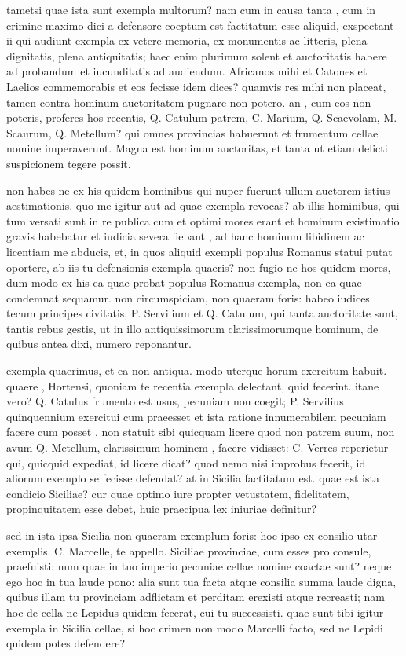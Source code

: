  tametsi quae ista sunt exempla multorum? nam cum in causa tanta , cum in crimine maximo dici a defensore coeptum est factitatum esse aliquid, exspectant ii qui audiunt exempla ex vetere memoria, ex monumentis ac litteris, plena dignitatis, plena antiquitatis; haec enim plurimum solent et auctoritatis habere ad probandum et iucunditatis ad audiendum. Africanos mihi et Catones et Laelios commemorabis et eos fecisse idem dices? quamvis res mihi non placeat, tamen contra hominum auctoritatem pugnare non potero. an , cum eos non poteris, proferes hos recentis, Q. Catulum patrem, C. Marium, Q. Scaevolam, M. Scaurum, Q. Metellum? qui omnes provincias habuerunt et frumentum cellae nomine imperaverunt. Magna est hominum auctoritas, et tanta ut etiam delicti suspicionem tegere possit.

 non habes ne ex his quidem hominibus qui nuper fuerunt ullum auctorem istius aestimationis. quo me igitur aut ad quae exempla revocas? ab illis hominibus, qui tum versati sunt in re publica cum et optimi mores erant et hominum existimatio gravis habebatur et iudicia severa fiebant , ad hanc hominum libidinem ac licentiam me abducis, et, in quos aliquid exempli populus Romanus statui putat oportere, ab iis tu defensionis exempla quaeris? non fugio ne hos quidem mores, dum modo ex his ea quae probat populus Romanus exempla, non ea quae condemnat sequamur. non circumspiciam, non quaeram foris: habeo iudices tecum principes civitatis, P. Servilium et Q. Catulum, qui tanta auctoritate sunt, tantis rebus gestis, ut in illo antiquissimorum clarissimorumque hominum, de quibus antea dixi, numero reponantur.

 exempla quaerimus, et ea non antiqua. modo uterque horum exercitum habuit. quaere , Hortensi, quoniam te recentia exempla delectant, quid fecerint. itane vero? Q. Catulus frumento est usus, pecuniam non coegit; P. Servilius quinquennium exercitui cum praeesset et ista ratione innumerabilem pecuniam facere cum posset , non statuit sibi quicquam licere quod non patrem suum, non avum Q. Metellum, clarissimum hominem , facere vidisset: C. Verres reperietur qui, quicquid expediat, id licere dicat? quod nemo nisi improbus fecerit, id aliorum exemplo se fecisse defendat? at in Sicilia factitatum est. quae est ista condicio Siciliae? cur quae optimo iure propter vetustatem, fidelitatem, propinquitatem esse debet, huic praecipua lex iniuriae definitur?

 sed in ista ipsa Sicilia non quaeram exemplum foris: hoc ipso ex consilio utar exemplis. C. Marcelle, te appello. Siciliae provinciae, cum esses pro consule, praefuisti: num quae in tuo imperio pecuniae cellae nomine coactae sunt? neque ego hoc in tua laude pono: alia sunt tua facta atque consilia summa laude digna, quibus illam tu provinciam adflictam et perditam erexisti atque recreasti; nam hoc de cella ne Lepidus quidem fecerat, cui tu successisti. quae sunt tibi igitur exempla in Sicilia cellae, si hoc crimen non modo Marcelli facto, sed ne Lepidi quidem potes defendere?

